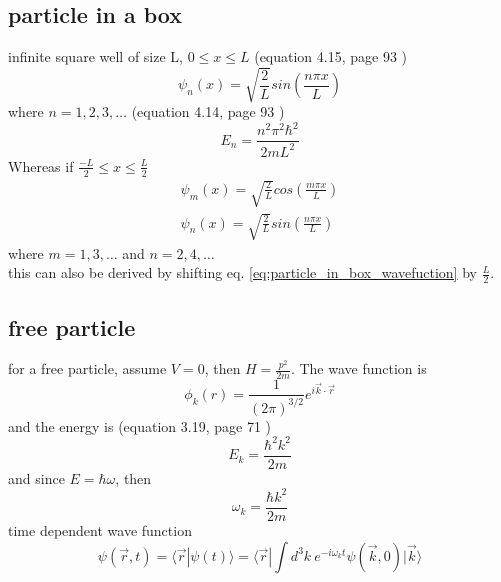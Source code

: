 \documentclass[12pt]{article}  %
\begin{document}
\subsection{particle in a box}
infinite square well of size L, $0 \leq x \leq L$ (equation 4.15, page 93 \cite{LiboffQM})
\begin{equation}
\psi_n(x) = \sqrt{\frac{2}{L}} sin \left( \frac{n \pi x}{L} \right)
\label{eq:particle_in_box_wavefuction}
\end{equation}
where $n = 1,2,3, \ldots$ (equation 4.14, page 93 \cite{LiboffQM})
\begin{equation}
E_n = \frac{n^2 \pi^2 \hbar^2}{2 m L^2}
\label{eq:particle_in_box_energy}
\end{equation}
Whereas if $\frac{-L}{2} \leq x \leq \frac{L}{2}$
\begin{equation}
\begin{gathered}
\psi_m(x) = \sqrt{\frac{2}{L}} cos \left( \frac{m \pi x}{L} \right) \\ 
\psi_n(x) = \sqrt{\frac{2}{L}} sin \left( \frac{n \pi x}{L} \right)
\end{gathered}
\end{equation}
where $m = 1,3, \ldots$ and $n = 2,4, \ldots$\\ 
this can also be derived by shifting eq. \ref{eq:particle_in_box_wavefuction} by $\frac{L}{2}$.

\subsection{free particle}
for a free particle, assume $V=0$, then $H = \frac{p^2}{2m}$. The wave function is
\begin{equation}
\phi_k(r) = \frac{1}{(2 \pi)^{3/2}} e^{i \vec{k} \cdot \vec{r}}
\label{eq:free_particle_wave}
\end{equation}
and the energy is (equation 3.19, page 71 \cite{LiboffQM})
\begin{equation}
E_k = \frac{\hbar^2 k^2}{2m}
\label{eq:energy_free_particle_wave}
\end{equation}
and since $E = \hbar \omega$, then
\begin{equation}
\omega_k = \frac{\hbar k^2}{2m}
\end{equation}
time dependent wave function
\begin{equation}
\psi(\vec{r},t) = \langle \vec{r} | \psi(t) \rangle = \langle \vec{r} | \int d^3 k \ e^{-i \omega_k t} \psi(\vec{k},0) | \vec{k} \rangle
\label{eq:time_dependent_free_particle_wave_function}
\end{equation}
\end{document}
